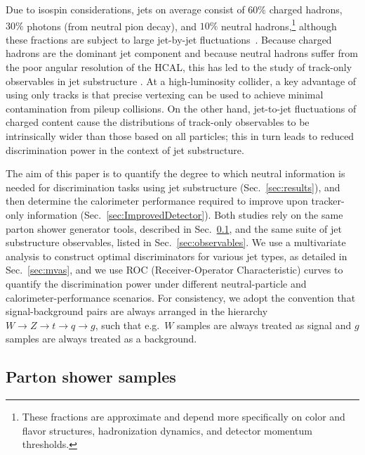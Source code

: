 \documentclass[11pt,letterpaper]{article}
\DeclareRobustCommand{\Sec}[1]{Sec.~\ref{#1}}
\begin{document}
Due to isospin considerations, jets on average consist of $60\%$ charged hadrons, $30\%$ photons (from neutral pion decay), and $10\%$ neutral hadrons,\footnote{These fractions are approximate and depend more specifically on color and flavor structures, hadronization dynamics, and detector momentum thresholds.} although these fractions are subject to large jet-by-jet fluctuations~\cite{Sirunyan:2017ulk,Aaboud:2017aca}.
%
Because charged hadrons are the dominant jet component and because neutral hadrons suffer from the poor angular resolution of the HCAL, this has led to the study of track-only observables in jet substructure \cite{Aad:2014gea,Aad:2015cua,ATLAS-CONF-2016-055,Aad:2016oit,ATLAS:2016vmy,ATLAS:2016wzt,Krohn:2012fg,Waalewijn:2012sv,Chang:2013iba,Chang:2013rca,Schaetzel:2013vka,Larkoski:2015yqa,Spannowsky:2015eba,Bressler:2015uma}.
%
At a high-luminosity collider, a key advantage of using only tracks is that precise vertexing can be used to achieve minimal contamination from pileup collisions.
%
On the other hand, jet-to-jet fluctuations of charged content cause the distributions of track-only observables to be intrinsically wider than those based on all particles; this in turn leads to reduced discrimination power in the context of jet substructure.

The aim of this paper is to quantify the degree to which neutral information is needed for discrimination tasks using jet substructure (\Sec{sec:results}), and then determine the calorimeter performance required to improve upon tracker-only information (\Sec{sec:ImprovedDetector}).
%
Both studies rely on the same parton shower generator tools, described in \Sec{sec:mc}, and the same suite of jet substructure observables, listed in \Sec{sec:observables}.
%
We use a multivariate analysis to construct optimal discriminators for various jet types, as detailed in \Sec{sec:mvas}, and we use ROC (Receiver-Operator Characteristic) curves to quantify the discrimination power under different neutral-particle and calorimeter-performance scenarios.
%
For consistency, we adopt the convention that signal-background pairs are always arranged in the hierarchy $W \to Z \to t \to q \to g$, such that e.g.\ $W$ samples are always treated as signal and $g$ samples are always treated as a background.

\subsection{Parton shower samples}
\label{sec:mc}
\end{document}
